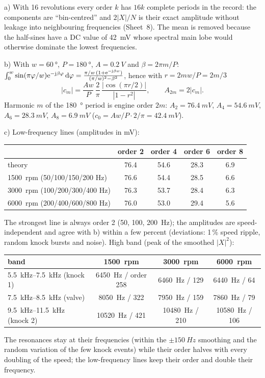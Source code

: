 \begin{solution}
a) 
With 16 revolutions every order $k$ has $16k$ complete periods in the
record: the components are ``bin-centred'' and $2|X|/N$ is their exact
amplitude without leakage into neighbouring frequencies (Sheet~8). The mean is
removed because the half-sines have a DC value of \SI{42}{mV} whose spectral
main lobe would otherwise dominate the lowest frequencies.

b) With $w=\SI{60}{\degree}$, $P=\SI{180}{\degree}$, $A=\SI{0.2}{V}$ and
$\beta=2\pi m/P$:
$\int_0^w\sin(\pi\varphi/w)\mathrm{e}^{-\mathrm{j}\beta\varphi}\,\mathrm{d}\varphi
=\frac{\pi/w\,(1+\mathrm{e}^{-\mathrm{j}\beta w})}{(\pi/w)^2-\beta^2}$, hence with
$r=2mw/P=2m/3$
\[
|c_m|=\frac{Aw}{P}\,\frac{2}{\pi}\,\frac{|\cos(\pi r/2)|}{|1-r^2|},
\qquad A_{2m}=2|c_m| .
\]
Harmonic $m$ of the \SI{180}{\degree} period is engine order $2m$:
$A_2=\SI{76.4}{mV}$, $A_4=\SI{54.6}{mV}$, $A_6=\SI{28.3}{mV}$,
$A_8=\SI{6.9}{mV}$ ($c_0=Aw/P\cdot2/\pi=\SI{42.4}{mV}$).

c) Low-frequency lines (amplitudes in mV):
\begin{center}\small
\begin{tabular}{@{}lcccc@{}}\toprule
 & order 2 & order 4 & order 6 & order 8\\\midrule
theory & 76.4 & 54.6 & 28.3 & 6.9\\
\SI{1500}{rpm} (50/100/150/200 Hz) & 76.6 & 54.4 & 28.5 & 6.6\\
\SI{3000}{rpm} (100/200/300/400 Hz) & 76.3 & 53.7 & 28.4 & 6.3\\
\SI{6000}{rpm} (200/400/600/800 Hz) & 76.0 & 53.0 & 29.4 & 5.6\\\bottomrule
\end{tabular}
\end{center}
The strongest line is always order 2 (50, 100, \SI{200}{Hz}); the amplitudes
are speed-independent and agree with b) within a few percent (deviations:
1\,\% speed ripple, random knock bursts and noise). High band (peak of the
smoothed $|X|^2$):
\begin{center}\small
\begin{tabular}{@{}lccc@{}}\toprule
band & \SI{1500}{rpm} & \SI{3000}{rpm} & \SI{6000}{rpm}\\\midrule
\SIrange{5.5}{7.5}{kHz} (knock 1) & \SI{6450}{Hz} / order 258 & \SI{6460}{Hz} / 129 & \SI{6440}{Hz} / 64\\
\SIrange{7.5}{8.5}{kHz} (valve) & \SI{8050}{Hz} / 322 & \SI{7950}{Hz} / 159 & \SI{7860}{Hz} / 79\\
\SIrange{9.5}{11.5}{kHz} (knock 2) & \SI{10520}{Hz} / 421 & \SI{10480}{Hz} / 210 & \SI{10580}{Hz} / 106\\\bottomrule
\end{tabular}
\end{center}
The resonances stay at their frequencies (within the $\pm\SI{150}{Hz}$
smoothing and the random variation of the few knock events) while their
order halves with every doubling of the speed; the low-frequency lines keep
their order and double their frequency.


\end{solution}
